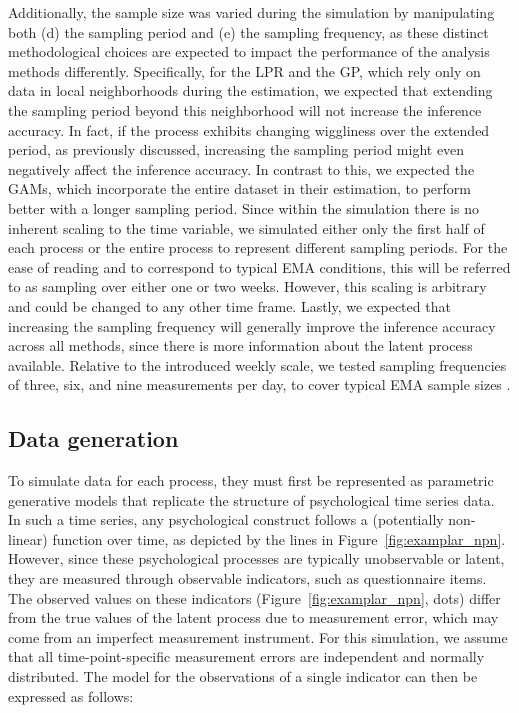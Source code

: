 \documentclass[man, floatsintext]{apa7}
\begin{document}
Additionally, the sample size was varied during the simulation by manipulating
both (d) the sampling period and (e) the sampling frequency, as these distinct
methodological choices are expected to impact the performance of the analysis
methods differently. Specifically, for the LPR and the GP, which rely only on
data in local neighborhoods during the estimation, we expected that extending
the sampling period beyond this neighborhood will not increase the inference
accuracy. In fact, if the process exhibits changing wiggliness over the
extended period, as previously discussed, increasing the sampling period might
even negatively affect the inference accuracy. In contrast to this, we expected
the GAMs, which incorporate the entire dataset in their estimation, to perform
better with a longer sampling period. Since within the simulation there is no
inherent scaling to the time variable, we simulated either only the first half
of each process or the entire process to represent different sampling periods.
For the ease of reading and to correspond to typical EMA conditions, this will
be referred to as sampling over either one or two weeks. However, this scaling
is arbitrary and could be changed to any other time frame. Lastly, we expected
that increasing the sampling frequency will generally improve the inference
accuracy across all methods, since there is more information about the latent
process available. Relative to the introduced weekly scale, we tested sampling
frequencies of three, six, and nine measurements per day, to cover typical EMA
sample sizes \parencite{wrzus_ecological_2023}.

\subsection{Data generation}

To simulate data for each process, they must first be represented as parametric
generative models that replicate the structure of psychological time series
data. In such a time series, any psychological construct follows a (potentially
non-linear) function over time, as depicted by the lines in
Figure~\ref{fig:examplar_npn}. However, since these psychological processes are
typically unobservable or latent, they are measured through observable
indicators, such as questionnaire items. The observed values on these
indicators (Figure~\ref{fig:examplar_npn}, dots) differ from the true values of
the latent process due to measurement error, which may come from an imperfect
measurement instrument. For this simulation, we assume that all
time-point-specific measurement errors are independent and normally
distributed. The model for the observations of a single indicator can then be
expressed as follows:
\end{document}
